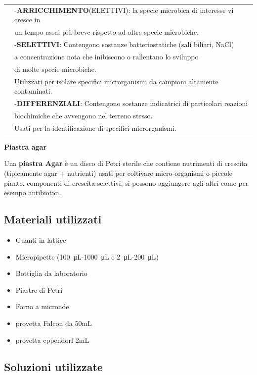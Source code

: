 \begin{tabular}{ll}
& -\textbf{ARRICCHIMENTO}(ELETTIVI): la specie microbica di interesse vi cresce in \\ \cline{1-1}
& un tempo assai più breve rispetto ad altre specie microbiche.\\
& -\textbf{SELETTIVI}: Contengono sostanze batteriostatiche (sali biliari, NaCl) \\
&  a concentrazione nota che inibiscono o rallentano lo sviluppo \\
& di molte specie microbiche. \\
&  Utilizzati per isolare specifici microrganismi da campioni altamente contaminati.\\
& -\textbf{DIFFERENZIALI}: Contengono sostanze indicatrici di particolari reazioni \\
& biochimiche che avvengono nel terreno stesso. \\
& Usati per la identificazione di specifici microrganismi.\\


\end{tabular}

\textbf{Piastra agar}
\vspace{0.3cm}

Una \textbf{piastra Agar} è un disco di Petri sterile che contiene nutrimenti
di crescita (tipicamente agar + nutrienti) usati per coltivare micro-organismi o piccole piante.
componenti di crescita selettivi, si possono aggiungere agli altri come per esempo antibiotici.




\subsection{Materiali utilizzati}

\begin{itemize}
	\item Guanti in lattice
	\item Micropipette (\SI{100}{\micro\liter}-\SI{1000}{\micro\liter} e \SI{2}{\micro\liter}-\SI{200}{\micro\liter})
	\item Bottiglia da laboratorio
  \item Piastre di Petri
	\item Forno a micronde
  \item provetta Falcon da 50mL
  \item provetta eppendorf 2mL

\end{itemize}

\subsection{Soluzioni utilizzate}

